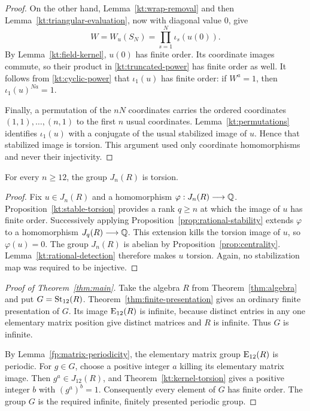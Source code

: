 \begin{proof}
On the other hand, Lemma~\ref{kt:wrap-removal} and then
Lemma~\ref{kt:triangular-evaluation}, now with diagonal value $0$,
give
\begin{equation}\label{kt:truncated-power}
 W=W_u(S_N)=\prod_{s=1}^{N}\iota_s(u(0)).
\end{equation}
By Lemma~\ref{kt:field-kernel}, $u(0)$ has finite order.  Its
coordinate images commute, so their product in
\eqref{kt:truncated-power} has finite order as well.  It follows
from \eqref{kt:cyclic-power} that $\iota_1(u)$ has finite order:
if $W^a=1$, then $\iota_1(u)^{Na}=1$.

Finally, a permutation of the $nN$ coordinates carries the ordered
coordinates $(1,1),\ldots,(n,1)$ to the first $n$ usual coordinates.
Lemma~\ref{kt:permutations} identifies $\iota_1(u)$ with a conjugate
of the usual stabilized image of $u$.  Hence that stabilized image
is torsion.  This argument used only coordinate homomorphisms and
never their injectivity.
\end{proof}

\begin{theorem}\label{kt:kernel-torsion}
For every $n\geq 12$, the group $J_n(R)$ is torsion.
\end{theorem}

\begin{proof}
Fix $u\in J_n(R)$ and a homomorphism
$\varphi:J_n(R)\longrightarrow\mathbb Q$.  Proposition~\ref{kt:stable-torsion}
provides a rank $q\geq n$ at which the image of $u$ has finite order.
Successively applying Proposition~\ref{prop:rational-stability}
extends $\varphi$ to a homomorphism $J_q(R)\longrightarrow\mathbb Q$.
This extension kills the torsion image of $u$, so $\varphi(u)=0$.
The group $J_n(R)$ is abelian by Proposition~\ref{prop:centrality}.
Lemma~\ref{kt:rational-detection} therefore makes $u$ torsion.
Again, no stabilization map was required to be injective.
\end{proof}

\begin{proof}[Proof of Theorem~\ref{thm:main}]
Take the algebra $R$ from Theorem~\ref{thm:algebra} and put
$G=\operatorname{St}_{12}(R)$.  Theorem~\ref{thm:finite-presentation} gives an
ordinary finite presentation of $G$.  Its image $\operatorname{E}_{12}(R)$ is
infinite, because distinct entries in any one elementary matrix
position give distinct matrices and $R$ is infinite.  Thus $G$
is infinite.

By Lemma~\ref{fp:matrix-periodicity}, the elementary matrix group
$\operatorname{E}_{12}(R)$ is periodic.  For $g\in G$, choose a positive integer
$a$ killing its elementary matrix image.  Then $g^a\in J_{12}(R)$,
and Theorem~\ref{kt:kernel-torsion} gives a positive integer $b$
with $(g^a)^b=1$.  Consequently every element of $G$ has finite
order.  The group $G$ is the required infinite, finitely presented
periodic group.
\end{proof}


